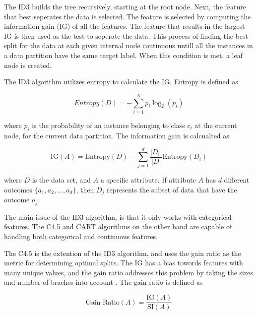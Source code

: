 \documentclass[conference]{IEEEtran}
\begin{document}
        The ID3 \cite{DT_quinlan1986} builds the tree recursively, starting at the root node. Next, the feature that best
        seperates the data is selected. The feature is selected by computing the information gain (IG) of all the features.
        The feature that results in the largest IG is then used as the test to seperate the data.
        This process of finding the best split for the data at each given internal node continuous untill all the instances
        in a data partition have the same target label. When this condition is met, a leaf node is created.

        The ID3 algorithm utilizes entropy to calculate the IG. Entropy is defined as

        \begin{equation}
            Entropy(D) = - \sum_{i=1}^{N} p_i \log_2(p_i)
        \end{equation}
                
        where $p_{i}$ is the probability of an instance belonging to class $c_{i}$ at the current node, for the current
        data partition. The information gain is calcualted as

        \begin{equation}
            \text{IG}(A) = \text{Entropy}(D) - \sum_{j=1}^{d} \frac{|D_i|}{|D|} \text{Entropy}(D_i)
        \end{equation}
            
        where $D$ is the data set, and $A$ a specific attribute. If attribute $A$ has $d$ different outcomes
        $\{a_1, a_2, ..., a_d\}$, then $D_j$ represents the subset of data that have the outcome $a_j$.

        The main issue of the ID3 algorithm, is that it only works with categorical features. The C4.5 \cite{DT_quinlan1993}
        and CART \cite{DT_breiman1984classification} algorithms on the other hand are capable of handling both categorical and
        continuous features.

        The C4.5 is the extention of the ID3 algorithm, and uses the gain ratio as the metric for determining optimal
        splits. The IG has a bias towords features with many unique values, and the gain ratio addresses
        this problem by taking the sizes and number of braches into account \cite{Kelleher2015}. The gain ratio is defined as

        \begin{equation}
            \text{Gain Ratio}(A) = \frac{\text{IG}(A)}{\text{SI}(A)}
        \end{equation}
            
\end{document}
